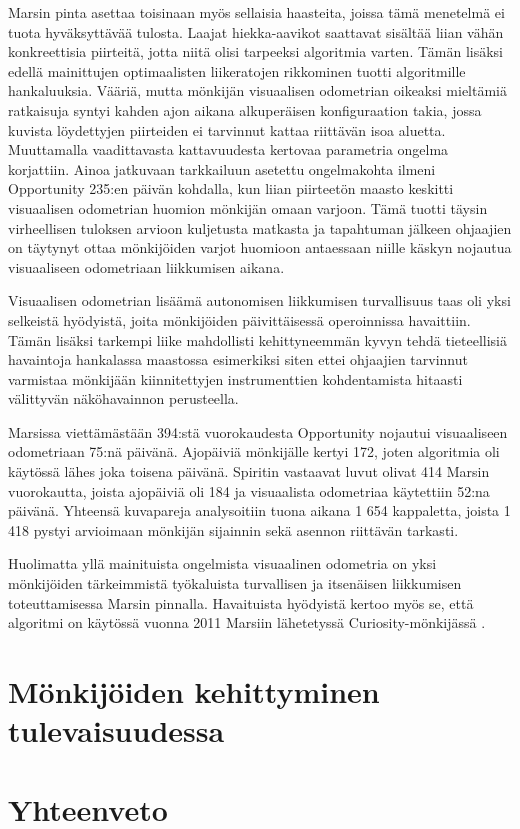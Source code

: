 \documentclass[finnish]{tktltiki2}
\theoremstyle{definition}
\theoremstyle{remark}
\begin{document}
Marsin pinta asettaa toisinaan myös sellaisia haasteita, joissa tämä menetelmä ei tuota hyväksyttävää tulosta. Laajat hiekka-aavikot saattavat sisältää liian vähän konkreettisia piirteitä, jotta niitä olisi tarpeeksi algoritmia varten. Tämän lisäksi edellä mainittujen optimaalisten liikeratojen rikkominen tuotti algoritmille hankaluuksia. Vääriä, mutta mönkijän visuaalisen odometrian oikeaksi mieltämiä ratkaisuja syntyi kahden ajon aikana alkuperäisen konfiguraation takia, jossa kuvista löydettyjen piirteiden ei tarvinnut kattaa riittävän isoa aluetta. Muuttamalla vaadittavasta kattavuudesta kertovaa parametria ongelma korjattiin. Ainoa jatkuvaan tarkkailuun asetettu ongelmakohta ilmeni Opportunity 235:en päivän kohdalla, kun liian piirteetön maasto keskitti visuaalisen odometrian huomion mönkijän omaan varjoon. Tämä tuotti täysin virheellisen tuloksen arvioon kuljetusta matkasta ja tapahtuman jälkeen ohjaajien on täytynyt ottaa mönkijöiden varjot huomioon antaessaan niille käskyn nojautua visuaaliseen odometriaan liikkumisen aikana. 

Visuaalisen odometrian lisäämä autonomisen liikkumisen turvallisuus taas oli yksi selkeistä hyödyistä, joita mönkijöiden päivittäisessä operoinnissa havaittiin. Tämän lisäksi tarkempi liike mahdollisti kehittyneemmän kyvyn tehdä tieteellisiä havaintoja hankalassa maastossa esimerkiksi siten ettei ohjaajien tarvinnut varmistaa mönkijään kiinnitettyjen instrumenttien kohdentamista hitaasti välittyvän näköhavainnon perusteella.

Marsissa viettämästään 394:stä vuorokaudesta Opportunity nojautui visuaaliseen odometriaan 75:nä päivänä. Ajopäiviä mönkijälle kertyi 172, joten algoritmia oli käytössä lähes joka toisena päivänä. Spiritin vastaavat luvut olivat 414 Marsin vuorokautta, joista ajopäiviä oli 184 ja visuaalista odometriaa käytettiin 52:na päivänä. Yhteensä kuvapareja analysoitiin tuona aikana 1 654 kappaletta, joista 1 418 pystyi arvioimaan mönkijän sijainnin sekä asennon riittävän tarkasti. \cite{cheng2005visual}

Huolimatta yllä mainituista ongelmista visuaalinen odometria on yksi mönkijöiden tärkeimmistä työkaluista turvallisen ja itsenäisen liikkumisen toteuttamisessa Marsin pinnalla. Havaituista hyödyistä kertoo myös se, että algoritmi on käytössä vuonna 2011 Marsiin lähetetyssä Curiosity-mönkijässä \cite{grotzinger2012mars}.

\section{Mönkijöiden kehittyminen tulevaisuudessa}


\section{Yhteenveto}







% 
\end{document}
